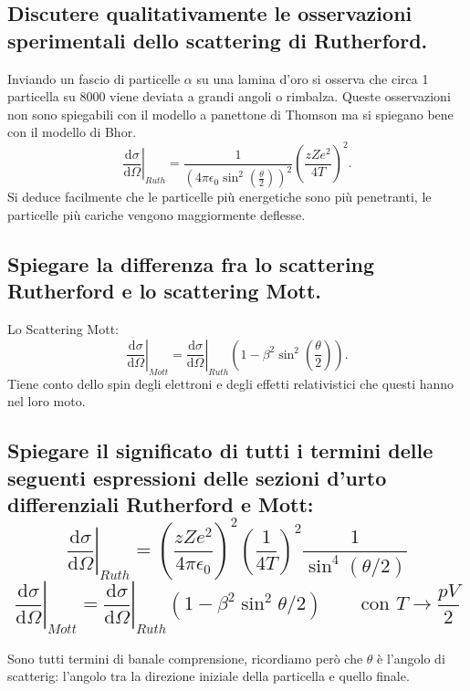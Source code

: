 \subsection[$\ $ osservazioni sullo scattering Rutherford]{Discutere qualitativamente le osservazioni sperimentali dello scattering di Rutherford.}
Inviando un fascio di particelle $\alpha$ su una lamina d'oro si osserva che circa 1 particella su 8000 viene deviata a grandi angoli o rimbalza. Queste osservazioni non sono spiegabili con il modello a panettone di Thomson ma si spiegano bene con il modello di Bhor.
\[
	\left. \frac{\mbox{d} \sigma}{\mbox{d} \Omega} \right|_{Ruth} = \frac{1}{\left(4\pi \epsilon_0\sin^{2}\left( \frac{\theta}{2} \right) \right)^2 } \left(\frac{zZe^2}{4T} \right)^2 
.\] 
Si deduce facilmente che le particelle più energetiche sono più penetranti, le particelle più cariche vengono maggiormente deflesse.

\subsection[$\ $ Differenza tra Scattering Rutherford e Mott]{Spiegare la differenza fra lo scattering Rutherford e lo scattering Mott.}
Lo Scattering Mott:
\[
	\left. \frac{\mbox{d} \sigma}{\mbox{d} \Omega} \right|_{Mott} = \left. \frac{\mbox{d} \sigma}{\mbox{d} \Omega} \right|_{Ruth} \left( 1- \beta^2 \sin^2\left( \frac{\theta}{2} \right)  \right) 
.\] 
Tiene conto dello spin degli elettroni e degli effetti relativistici che questi hanno nel loro moto.

\subsection[$\ $ Significato dei termini nelle sezioni d'urto Mott e Rutherford]{Spiegare il significato di tutti i termini delle seguenti espressioni delle sezioni d’urto differenziali Rutherford e Mott: 
\[
	\left. \frac{\mbox{d} \sigma}{\mbox{d} \Omega} \right|_{Ruth} = \left( \frac{zZe^2}{4 \pi \epsilon_0} \right)^2 \left( \frac{1}{4T} \right)^2 \frac{1}{\sin^4\left( \theta/2 \right) }  
\] 
\[
	\left. \frac{\mbox{d} \sigma}{\mbox{d} \Omega} \right|_{Mott} = \left. \frac{\mbox{d} \sigma}{\mbox{d} \Omega} \right|_{Ruth} \left( 1 - \beta^2 \sin^2 \theta/2  \right) \quad \quad
	\text{con } T \to \frac{pV}{2}
\] 
}
Sono tutti termini di banale comprensione, ricordiamo però che $\theta$ è l'angolo di scatterig: l'angolo tra la direzione iniziale della particella e quello finale.

